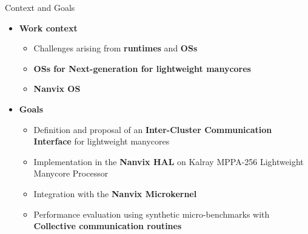 	\begin{frame}[fragile]{Context and Goals}
		\begin{itemize}
			\item \textbf{Work context}
			\begin{itemize}
				\setlength \itemsep{0.3em}

				\item Challenges arising from \textbf{runtimes} and \textbf{OSs}
				\item \textbf{OSs for Next-generation for lightweight manycores}
				\item \textbf{Nanvix OS}
			\end{itemize}
		\end{itemize}

		\begin{itemize}
			\item \textbf{Goals}
			\begin{itemize}
				\setlength \itemsep{0.3em}

				\item Definition and proposal of an \textbf{Inter-Cluster Communication Interface} for lightweight manycores
				\item Implementation in the \textbf{Nanvix HAL} on Kalray MPPA-256 Lightweight Manycore Processor
				\item Integration with the \textbf{Nanvix Microkernel}
				\item Performance evaluation using synthetic micro-benchmarks with \textbf{Collective communication routines}
			\end{itemize}
		\end{itemize}

	\end{frame}

		


